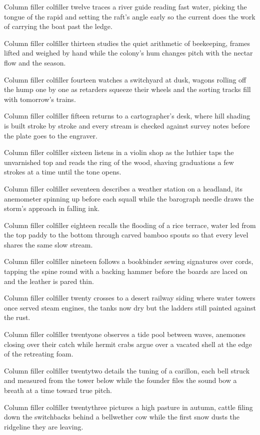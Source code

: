 \documentclass[twocolumn]{article}
\begin{document}
Column filler colfiller twelve traces a river guide reading fast water,
picking the tongue of the rapid and setting the raft's angle early so the
current does the work of carrying the boat past the ledge.

Column filler colfiller thirteen studies the quiet arithmetic of beekeeping,
frames lifted and weighed by hand while the colony's hum changes pitch with
the nectar flow and the season.

Column filler colfiller fourteen watches a switchyard at dusk, wagons rolling
off the hump one by one as retarders squeeze their wheels and the sorting
tracks fill with tomorrow's trains.

Column filler colfiller fifteen returns to a cartographer's desk, where hill
shading is built stroke by stroke and every stream is checked against survey
notes before the plate goes to the engraver.

Column filler colfiller sixteen listens in a violin shop as the luthier taps
the unvarnished top and reads the ring of the wood, shaving graduations a few
strokes at a time until the tone opens.

Column filler colfiller seventeen describes a weather station on a headland,
its anemometer spinning up before each squall while the barograph needle
draws the storm's approach in falling ink.

Column filler colfiller eighteen recalls the flooding of a rice terrace, water
led from the top paddy to the bottom through carved bamboo spouts so that
every level shares the same slow stream.

Column filler colfiller nineteen follows a bookbinder sewing signatures over
cords, tapping the spine round with a backing hammer before the boards are
laced on and the leather is pared thin.

Column filler colfiller twenty crosses to a desert railway siding where water
towers once served steam engines, the tanks now dry but the ladders still
painted against the rust.

Column filler colfiller twentyone observes a tide pool between waves, anemones
closing over their catch while hermit crabs argue over a vacated shell at the
edge of the retreating foam.

Column filler colfiller twentytwo details the tuning of a carillon, each bell
struck and measured from the tower below while the founder files the sound
bow a breath at a time toward true pitch.

Column filler colfiller twentythree pictures a high pasture in autumn, cattle
filing down the switchbacks behind a bellwether cow while the first snow
dusts the ridgeline they are leaving.
\end{document}
